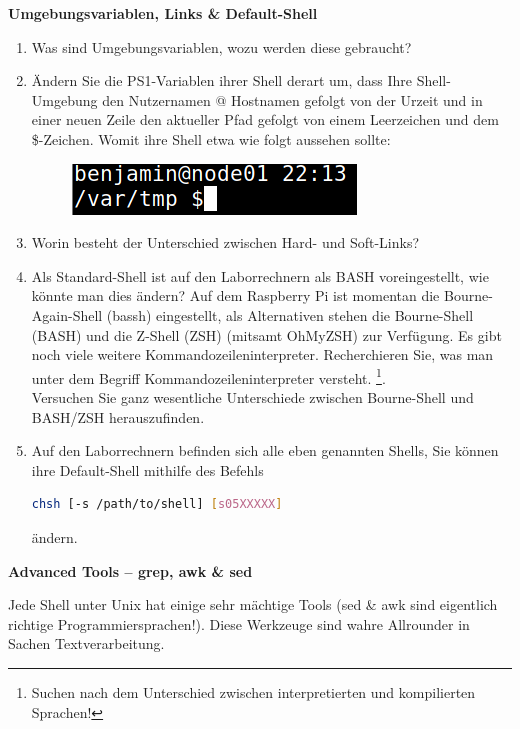 \documentclass[paper=a4,fontsize=11pt]{scrartcl}%
\numberwithin{equation}{section}
\begin{document}
\begin{center}\Large{\textbf{Umgebungsvariablen, Links \& Default-Shell}}\end{center}\vskip0.25in
\begin{enumerate}
\item Was sind Umgebungsvariablen, wozu werden diese gebraucht?
\item Ändern Sie die PS1-Variablen ihrer Shell derart um, dass Ihre Shell-Umgebung den Nutzernamen @ Hostnamen gefolgt von der Urzeit und in einer neuen Zeile den aktueller Pfad gefolgt von einem Leerzeichen und dem \$-Zeichen. Womit ihre Shell etwa wie folgt aussehen sollte:
\begin{figure}[H]
\includegraphics[scale=0.6]{ps1}
\end{figure}
\item Worin besteht der Unterschied zwischen Hard- und Soft-Links?
\item Als Standard-Shell ist auf den Laborrechnern als BASH voreingestellt, wie könnte man dies ändern? Auf dem Raspberry Pi ist momentan die Bourne-Again-Shell (bassh) eingestellt, als Alternativen stehen die Bourne-Shell (BASH) und die Z-Shell (ZSH) (mitsamt OhMyZSH) zur Verfügung. Es gibt noch viele weitere Kommandozeileninterpreter. Recherchieren Sie, was man unter dem Begriff Kommandozeileninterpreter versteht. \footnote{Suchen nach dem Unterschied zwischen interpretierten und kompilierten Sprachen!}.\\
Versuchen Sie ganz wesentliche Unterschiede zwischen Bourne-Shell und BASH/ZSH herauszufinden.
\item Auf den Laborrechnern befinden sich alle eben genannten Shells, Sie können ihre Default-Shell mithilfe des Befehls\\
    \begin{lstlisting}[style=Bash, language=Bash]
chsh [-s /path/to/shell] [s05XXXXX]
		\end{lstlisting}
		ändern. 
\end{enumerate}
\begin{center}\Large{\textbf{Advanced Tools -- grep, awk \& sed}}\end{center}\vskip0.25in
Jede Shell unter Unix hat einige sehr mächtige Tools (sed \& awk sind eigentlich richtige Programmiersprachen!). Diese Werkzeuge sind wahre Allrounder in Sachen Textverarbeitung.
\end{document}
